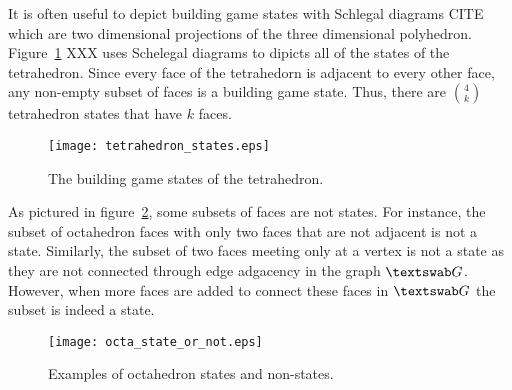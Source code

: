 It is often useful to depict building game states with Schlegal diagrams CITE which are two dimensional projections of the three dimensional polyhedron. Figure~\ref{fig:TetraStates} XXX uses Schelegal diagrams to dipicts all of the states of the tetrahedron. Since every face of the tetrahedorn is adjacent to every other face, any non-empty subset of faces is a building game state. Thus, there are ${4 \choose k}$ tetrahedron states that have $k$ faces. 
\begin{figure}[ht]
  \texttt{[image: tetrahedron\_states.eps]}
\caption{The building game states of the tetrahedron.}
\label{fig:TetraStates}
\end{figure}
As pictured in figure~\ref{fig:OctaStates}, some subsets of faces are not states. For instance, the subset of octahedron faces with only two faces that are not adjacent is not a state. Similarly, the subset of two faces meeting only at a vertex is not a state as they are not connected through edge adgacency in the graph $\PolyGraph$. However, when more faces are added to connect these faces in $\PolyGraph$ the subset is indeed a state.

\begin{figure}[ht]
  \texttt{[image: octa\_state\_or\_not.eps]}
\caption{Examples of octahedron states and non-states.}
\label{fig:OctaStates}
\end{figure}
 






